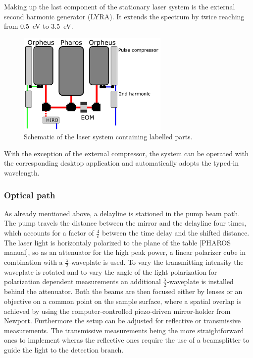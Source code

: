 Making up the last component of the stationary laser system is the external second harmonic generator (LYRA).
It extends the spectrum by twice reaching from \qty{0.5}{eV} to \qty{3.5}{eV}. 
\begin{figure}[ht]
    \centering
    \includegraphics[width=0.65\textwidth]{pictures/laser_system.png}
    \caption{Schematic of the laser system containing labelled parts.}
    \label{fig:laser_systems}
\end{figure}
With the exception of the external compressor, the system can be operated with the corresponding desktop application and automatically adopts the typed-in wavelength.

\subsubsection*{Optical path}
As already mentioned above, a delayline is stationed in the pump beam path.
The pump travels the distance between the mirror and the delayline four times, which accounts for a factor of $\frac{4}{c}$ between the time delay and the shifted distance.
The laser light is horizontaly polarized to the plane of the table [PHAROS manual], so as an attenuator for the high peak power, a linear polarizer cube in combination with a $\frac{\lambda}{2}$-waveplate is used.
To vary the transmitting intensity the waveplate is rotated and to vary the angle of the light polarization for polarization dependent measurements an additional $\frac{\lambda}{2}$-waveplate is installed behind the attenuator.
Both the beams are then focused either by lenses or an objective on a common point on the sample surface, where a spatial overlap is achieved by using the computer-controlled piezo-driven mirror-holder from Newport.
Furthermore the setup can be adjusted for reflective or transmissive measurements.
The transmissive measurements being the more straightforward ones to implement wheras the reflective ones require the use of a beamsplitter to guide the light to the detection branch.

